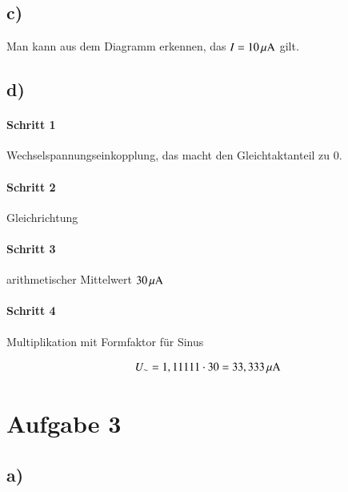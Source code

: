 \subsection*{c)}

Man kann aus dem Diagramm erkennen, das $I = \unit[10]{\mu A}$ gilt.


\subsection*{d)}

\paragraph{Schritt 1}

Wechselspannungseinkopplung, das macht den Gleichtaktanteil zu 0.

\paragraph{Schritt 2}

Gleichrichtung

\paragraph{Schritt 3}

arithmetischer Mittelwert $\unit[30]{\mu A}$

\paragraph{Schritt 4}

Multiplikation mit Formfaktor für Sinus

\begin{align*}
U_\sim = 1,11111 \cdot 30 = \unit[33,333]{\mu A}
\end{align*}


\section{Aufgabe 3}

\subsection*{a)}

